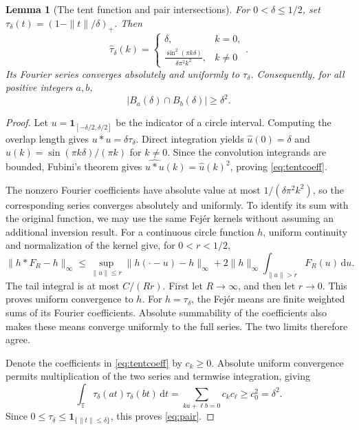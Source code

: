 \documentclass[12pt,leqno]{article}
\numberwithin{equation}{section}
\newtheorem{lemma}[theorem]{Lemma}
\theoremstyle{remark}
\newcommand{\LRtorus}{\mathbb T}
\newcommand{\LRindicator}{\mathbf 1}
\newcommand{\LRdifferential}{\,\mathrm d}
\begin{document}
\begin{lemma}[The tent function and pair intersections]\label{lem:pair}
For $0<\delta\le1/2$, set $\tau_\delta(t)=(1-\|t\|/\delta)_+$. Then
\begin{equation}\label{eq:tentcoeff}
\widehat\tau_\delta(k)=
\begin{cases}
\delta,&k=0,\\
\displaystyle\frac{\sin^2(\pi k\delta)}{\delta\pi^2k^2},&k\ne0
\end{cases}.
\end{equation}
Its Fourier series converges absolutely and uniformly to $\tau_\delta$. Consequently, for all positive integers $a,b$,
\begin{equation}\label{eq:pair}
|B_a(\delta)\cap B_b(\delta)|\ge\delta^2.
\end{equation}
\end{lemma}
\begin{proof}
Let $u=\LRindicator_{[-\delta/2,\delta/2]}$ be the indicator of a circle interval. Computing the overlap length gives $u*u=\delta\tau_\delta$. Direct integration yields $\widehat u(0)=\delta$ and $\widehat u(k)=\sin(\pi k\delta)/(\pi k)$ for $k\ne0$. Since the convolution integrands are bounded, Fubini's theorem gives $\widehat{u*u}(k)=\widehat u(k)^2$, proving \eqref{eq:tentcoeff}.

The nonzero Fourier coefficients have absolute value at most $1/(\delta\pi^2k^2)$, so the corresponding series converges absolutely and uniformly. To identify its sum with the original function, we may use the same Fej\'er kernels without assuming an additional inversion result. For a continuous circle function $h$, uniform continuity and normalization of the kernel give, for $0<r<1/2$,
\[
\|h*F_R-h\|_\infty
\le\sup_{\|u\|\le r}\|h(\cdot-u)-h\|_\infty
+2\|h\|_\infty\int_{\|u\|>r}F_R(u)\LRdifferential u.
\]
The tail integral is at most $C/(Rr)$. First let $R\to\infty$, and then let $r\to0$. This proves uniform convergence to $h$. For $h=\tau_\delta$, the Fej\'er means are finite weighted sums of its Fourier coefficients. Absolute summability of the coefficients also makes these means converge uniformly to the full series. The two limits therefore agree.

Denote the coefficients in \eqref{eq:tentcoeff} by $c_k\ge0$. Absolute uniform convergence permits multiplication of the two series and termwise integration, giving
\[
\int_{\LRtorus}\tau_\delta(at)\tau_\delta(bt)\LRdifferential t
=\sum_{ka+\ell b=0}c_kc_\ell\ge c_0^2=\delta^2.
\]
Since $0\le\tau_\delta\le\LRindicator_{\{\|t\|\le\delta\}}$, this proves \eqref{eq:pair}.
\end{proof}
\end{document}

